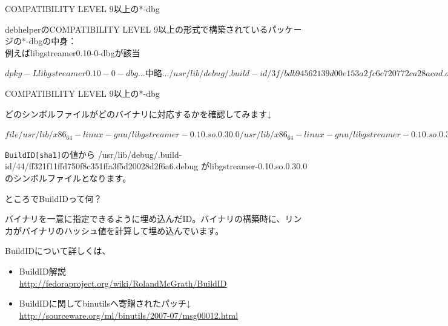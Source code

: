 \begin{frame}[containsverbatim]{COMPATIBILITY LEVEL 9以上の*-dbg}

 debhelperのCOMPATIBILITY LEVEL 9以上の形式で構築されているパッケージの*-dbgの中身：\\
例えばlibgstreamer0.10-0-dbgが該当
\begin{commandline}
$ dpkg -L libgstreamer0.10-0-dbg
...中略...
/usr/lib/debug/.build-id/3f/bdb94562139d00e153a2fc6c
720772ca28acad.debug
/usr/lib/debug/.build-id/86
/usr/lib/debug/.build-id/86/cc80bb6f2bdb31a2ed02973d
54530b3d99846f.debug
/usr/lib/debug/.build-id/44
/usr/lib/debug/.build-id/44/ff321f11ffd750f8c351ffa3
f5d20028d2f6a6.debug
/usr/share
/usr/share/doc
...中略...
$
\end{commandline}

\end{frame}

\begin{frame}[containsverbatim]{COMPATIBILITY LEVEL 9以上の*-dbg}

どのシンボルファイルがどのバイナリに対応するかを確認してみます↓
\begin{commandline}
$ file /usr/lib/x86_64-linux-gnu/libgstreamer-0.10.
so.0.30.0
/usr/lib/x86_64-linux-gnu/libgstreamer-0.10.so.0.30.0:
ELF 64-bit LSB  shared object, x86-64, version 1 
(SYSV), dynamically linked, 
BuildID[sha1]=44ff321f11ffd750f8c351ffa3f5d20028d2f6a6, 
stripped
$
\end{commandline}

 \verb+BuildID[sha1]+の値から /usr/lib/debug/.build-id/44/ff321f11ffd750f8c351ffa3f5d20028d2f6a6.debug がlibgstreamer-0.10.so.0.30.0のシンボルファイルとなります。

\end{frame}

\begin{frame}[containsverbatim]{ところでBuildIDって何？}

 バイナリを一意に指定できるように埋め込んだID。バイナリの構築時に、リンカがバイナリのハッシュ値を計算して埋め込んでいます。


 BuildIDについて詳しくは、
\begin{itemize}
\item BuildID解説 \\
\url{http://fedoraproject.org/wiki/RolandMcGrath/BuildID}
\item BuildIDに関してbinutilsへ寄贈されたパッチ↓\\
\url{http://sourceware.org/ml/binutils/2007-07/msg00012.html}
\end{itemize}

\end{frame}

